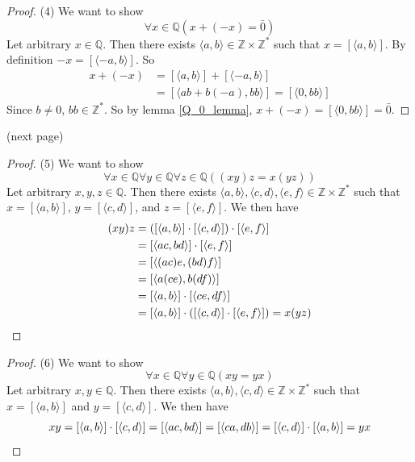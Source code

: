 \documentclass{report}
\begin{document}
\begin{proof}(4)
We want to show
\begin{equation*}
\forall x\in\mathbb Q(x+(-x)=\bar0)
\end{equation*}
Let arbitrary $x\in\mathbb Q$. Then there exists $\langle a,b\rangle\in\mathbb Z\times\mathbb Z^*$ such that 
$x=[\langle a,b\rangle]$.
By definition $-x=[\langle-a,b\rangle]$. So 
\begin{align*}
x+(-x)&=[\langle a,b\rangle]+[\langle-a,b\rangle]\\
&=[\langle ab+b(-a),bb\rangle]=[\langle 0,bb\rangle]
\end{align*}
Since $b\neq0$, $bb\in\mathbb Z^*$. So by lemma \ref{Q_0_lemma}, $x+(-x)=[\langle 0,bb\rangle]=\bar0$.
\end{proof}
\noindent(next page)\newpage
\begin{proof}(5)
We want to show
\begin{equation*}
\forall x\in\mathbb Q\forall y\in\mathbb Q\forall z\in\mathbb Q((xy)z=x(yz))
\end{equation*}
Let arbitrary $x,y,z\in\mathbb Q$. Then there exists $\langle a,b\rangle,\langle c,d\rangle,\langle e,f\rangle\in\mathbb Z\times\mathbb Z^*$ such that 
$x=[\langle a,b\rangle]$, $y=[\langle c,d\rangle]$, and $z=[\langle e,f\rangle]$. We then have
\begin{align*}
(xy)z&=([\langle a,b\rangle]\cdot[\langle c,d\rangle])\cdot[\langle e,f\rangle]\\
&=[\langle ac,bd\rangle]\cdot[\langle e,f\rangle]\\
&=[\langle(ac)e,(bd)f\rangle]\\
&=[\langle a(ce),b(df)\rangle]\\
&=[\langle a,b\rangle]\cdot[\langle ce,df\rangle]\\
&=[\langle a,b\rangle]\cdot([\langle c,d\rangle]\cdot[\langle e,f\rangle])=x(yz)\qedhere
\end{align*}
\end{proof}
\begin{proof}(6)
We want to show
\begin{equation*}
\forall x\in\mathbb Q\forall y\in\mathbb Q(xy=yx)
\end{equation*}
Let arbitrary $x,y\in\mathbb Q$.
Then there exists $\langle a,b\rangle,\langle c,d\rangle\in\mathbb Z\times\mathbb Z^*$ such that 
$x=[\langle a,b\rangle]$ and $y=[\langle c,d\rangle]$.
We then have
\begin{equation*}
xy=[\langle a,b\rangle]\cdot[\langle c,d\rangle]=[\langle ac,bd\rangle]=[\langle ca,db\rangle]=
[\langle c,d\rangle]\cdot[\langle a,b\rangle]=yx\qedhere
\end{equation*}
\end{proof}
\end{document}
